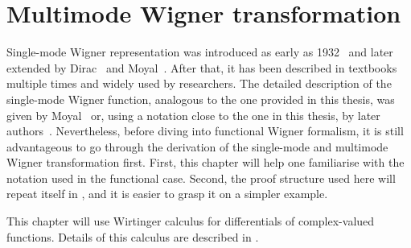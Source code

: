 \chapter{Multimode Wigner transformation}
\label{cha:mm-wigner}

Single-mode Wigner representation was introduced as early as 1932~\cite{Wigner1932} and later extended by Dirac~\cite{Dirac1945} and Moyal~\cite{Moyal1947}.
After that, it has been described in textbooks multiple times and widely used by researchers.
The detailed description of the single-mode Wigner function, analogous to the one provided in this thesis, was given by Moyal~\cite{Moyal1947} or, using a notation close to the one in this thesis, by later authors~\cite{Cahill1969,Hillery1984,Gardiner2004}.
Nevertheless, before diving into functional Wigner formalism, it is still advantageous to go through the derivation of the single-mode and multimode Wigner transformation first.
First, this chapter will help one familiarise with the notation used in the functional case.
Second, the proof structure used here will repeat itself in , and it is easier to grasp it on a simpler example.

This chapter will use Wirtinger calculus for differentials of complex-valued functions.
Details of this calculus are described in .




